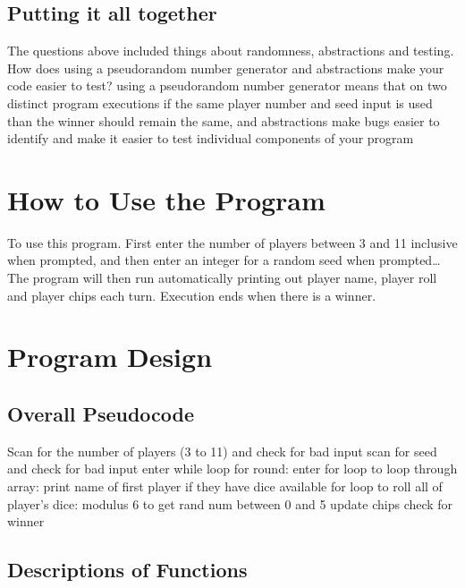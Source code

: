 \documentclass{article}
\begin{document}
\subsection{Putting it all together}

The questions above included things about randomness, abstractions and testing. How does using a pseudorandom number generator and abstractions make your code easier to test?
using a pseudorandom number generator means that on two distinct program executions if the same player number and seed input is used than the winner should remain the same, and abstractions make bugs easier to identify and make it easier to test individual components of your program

\section{How to Use the Program}

To use this program. First enter the number of players between 3 and 11 inclusive when prompted, and then enter an integer for a random seed when prompted… The program will then run automatically printing out player name, player roll and player chips each turn. Execution ends when there is a winner.

\section{Program Design}

\subsection{Overall Pseudocode}

Scan for the number of players (3 to 11) and check for bad input
scan for seed and check for bad input
enter while loop for round:
	enter for loop to loop through array:
		print name of first player if they have dice available
		for loop to roll all of player's dice:
			modulus 6 to get rand num between 0 and 5
			update chips
		check for winner

\subsection{Descriptions of Functions}
\end{document}
